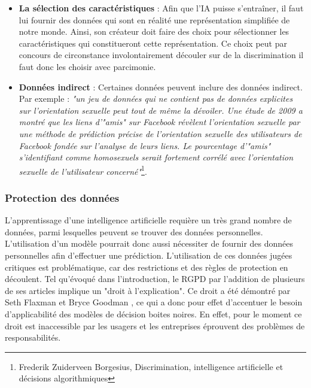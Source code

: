 \begin{itemize}
    \item \textbf{La sélection des caractéristiques} : Afin que l'IA puisse s'entraîner, il faut lui fournir des données qui sont en réalité une représentation simplifiée de notre monde. Ainsi, son créateur doit faire des choix pour sélectionner les caractéristiques qui constitueront cette représentation. Ce choix peut par concours de circonstance involontairement découler sur de la discrimination il faut donc les choisir avec parcimonie.
    \item \textbf{Données indirect} : Certaines données peuvent inclure des données indirect. Par exemple : \textit{"un jeu de données qui ne contient pas de données explicites sur l’orientation sexuelle peut tout de même la dévoiler. Une étude de 2009 a montré que les liens d’"amis" sur Facebook révèlent l’orientation sexuelle par une méthode de prédiction précise de l’orientation sexuelle des utilisateurs de Facebook fondée sur l’analyse de leurs liens. Le pourcentage d’"amis" s’identifiant comme homosexuels serait fortement corrélé avec l’orientation sexuelle de l’utilisateur concerné"}\footnote{Frederik Zuiderveen Borgesius, Discrimination, intelligence artificielle et décisions algorithmiques}. 
\end{itemize}
\subsubsection{Protection des données}
L'apprentissage d'une intelligence artificielle requière un très grand nombre de données, parmi lesquelles peuvent se trouver des données personnelles. L'utilisation d'un modèle pourrait donc aussi nécessiter de fournir des données personnelles afin d'effectuer une prédiction. L'utilisation de ces données jugées critiques est problématique, car des restrictions et des règles de protection en découlent. Tel qu'évoqué dans l'introduction, le RGPD par l'addition de plusieurs de ses articles implique un "droit à l'explication". Ce droit a été démontré par Seth Flaxman et Bryce Goodman \cite{RGPDexplanRight}, ce qui a donc pour effet d'accentuer le besoin d'applicabilité des modèles de décision boites noires. En effet, pour le moment ce droit est inaccessible par les usagers et les entreprises éprouvent des problèmes de responsabilités.

